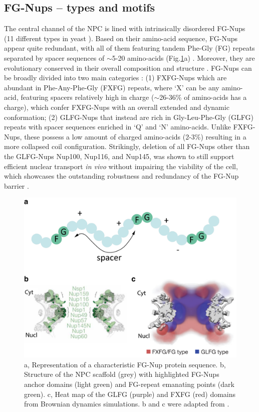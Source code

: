 \subsection{FG-Nups – types and motifs}
The central channel of the NPC is lined with intrinsically disordered FG-Nups (11 different types in yeast \cite{Yamada2010}). Based on their amino-acid sequence, FG-Nups appear quite redundant, with all of them featuring tandem Phe-Gly (FG) repeats separated by spacer sequences of $\sim$5-20 amino-acids (Fig.\ref{fig:fig1.3}a) \cite{Terry2009}. Moreover,  they are evolutionary conserved in their overall composition and structure \cite{Peyro2015}. FG-Nups can be broadly divided into two main categories \cite{Yamada2010,Terry2009}: (1) FXFG-Nups which are abundant in Phe-Any-Phe-Gly (FXFG) repeats, where ‘X’ can be any amino-acid, featuring spacers relatively high in charge ($\sim$26-36\% of amino-acids has a charge), which confer FXFG-Nups with an overall extended and dynamic conformation; (2) GLFG-Nups that instead are rich in Gly-Leu-Phe-Gly (GLFG) repeats with spacer sequences enriched in ‘Q’ and ‘N’ amino-acids. Unlike FXFG-Nups, these possess a low amount of charged amino-acids (2-3\%) resulting in a more collapsed coil configuration. Strikingly, deletion of all FG-Nups other than the GLFG-Nups Nup100, Nup116, and Nup145, was shown to still support efficient nuclear transport \emph{in vivo} without impairing the viability of the cell, which showcases the outstanding robustness and redundancy of the FG-Nup barrier \cite{Adams2016}.
\begin{figure}[!htbp]
	\centering
	\includegraphics[width=0.85\linewidth]{figures/Figure1.3.pdf}
	\caption{a, Representation of a characteristic FG-Nup protein sequence. b, Structure of the NPC scaffold (grey) with highlighted FG-Nups anchor domains (light green) and FG-repeat emanating points (dark green). c, Heat map of the GLFG (purple) and FXFG (red) domains from Brownian dynamics simulations. b and c were adapted from \cite{Kim2018}.}
	\label{fig:fig1.3}
\end{figure}

